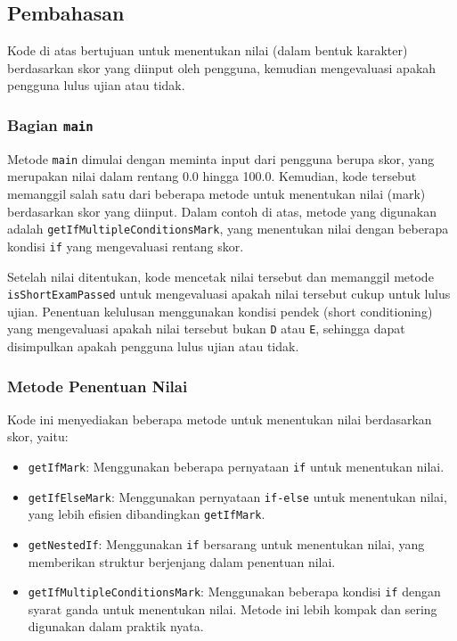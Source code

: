 \subsection{Pembahasan}

Kode di atas bertujuan untuk menentukan nilai (dalam bentuk karakter) berdasarkan skor yang diinput oleh pengguna, kemudian mengevaluasi apakah pengguna lulus ujian atau tidak.

\subsubsection{Bagian \texttt{main}}

Metode \texttt{main} dimulai dengan meminta input dari pengguna berupa skor, yang merupakan nilai dalam rentang 0.0 hingga 100.0. Kemudian, kode tersebut memanggil salah satu dari beberapa metode untuk menentukan nilai (mark) berdasarkan skor yang diinput. Dalam contoh di atas, metode yang digunakan adalah \texttt{getIfMultipleConditionsMark}, yang menentukan nilai dengan beberapa kondisi \texttt{if} yang mengevaluasi rentang skor.

Setelah nilai ditentukan, kode mencetak nilai tersebut dan memanggil metode \texttt{isShortExamPassed} untuk mengevaluasi apakah nilai tersebut cukup untuk lulus ujian. Penentuan kelulusan menggunakan kondisi pendek (short conditioning) yang mengevaluasi apakah nilai tersebut bukan \texttt{D} atau \texttt{E}, sehingga dapat disimpulkan apakah pengguna lulus ujian atau tidak.

\subsubsection{Metode Penentuan Nilai}

Kode ini menyediakan beberapa metode untuk menentukan nilai berdasarkan skor, yaitu:

\begin{itemize}
	\item \texttt{getIfMark}: Menggunakan beberapa pernyataan \texttt{if} untuk menentukan nilai.
	\item \texttt{getIfElseMark}: Menggunakan pernyataan \texttt{if-else} untuk menentukan nilai, yang lebih efisien dibandingkan \texttt{getIfMark}.
	\item \texttt{getNestedIf}: Menggunakan \texttt{if} bersarang untuk menentukan nilai, yang memberikan struktur berjenjang dalam penentuan nilai.
	\item \texttt{getIfMultipleConditionsMark}: Menggunakan beberapa kondisi \texttt{if} dengan syarat ganda untuk menentukan nilai. Metode ini lebih kompak dan sering digunakan dalam praktik nyata.
\end{itemize}

